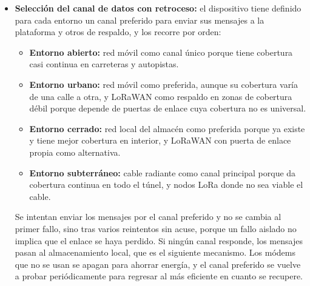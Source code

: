 \documentclass[11pt,a4paper]{article}
\begin{document}
\begin{itemize}
    \item \textbf{Selección del canal de datos con retroceso:} el dispositivo tiene definido para cada entorno un canal preferido para enviar sus mensajes a la plataforma y otros de respaldo, y los recorre por orden:
    \begin{itemize}
        \item \textbf{Entorno abierto:} red móvil como canal único porque tiene cobertura casi continua en carreteras y autopistas.

        \item \textbf{Entorno urbano:} red móvil como preferida, aunque su cobertura varía de una calle a otra, y LoRaWAN como respaldo en zonas de cobertura débil porque depende de puertas de enlace cuya cobertura no es universal.

        \item \textbf{Entorno cerrado:} red local del almacén como preferida porque ya existe y tiene mejor cobertura en interior, y LoRaWAN con puerta de enlace propia como alternativa.

        \item \textbf{Entorno subterráneo:} cable radiante como canal principal porque da cobertura continua en todo el túnel, y nodos LoRa donde no sea viable el cable.
    \end{itemize}

    Se intentan enviar los mensajes por el canal preferido y no se cambia al primer fallo, sino tras varios reintentos sin acuse, porque un fallo aislado no implica que el enlace se haya perdido. Si ningún canal responde, los mensajes pasan al almacenamiento local, que es el siguiente mecanismo. Los módems que no se usan se apagan para ahorrar energía, y el canal preferido se vuelve a probar periódicamente para regresar al más eficiente en cuanto se recupere.


\end{itemize}
\end{document}
